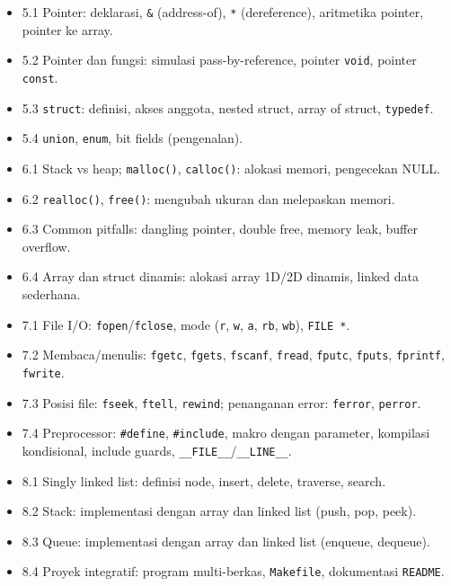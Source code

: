 \documentclass[12pt,a4paper]{article}
\begin{document}
\begin{description}[style=nextline,leftmargin=*]
  \item[CPMK-5:] \hfill
  \begin{itemize}[nosep]
    \item 5.1 Pointer: deklarasi, \texttt{\&} (address-of), \texttt{*} (dereference), aritmetika pointer, pointer ke array.
    \item 5.2 Pointer dan fungsi: simulasi pass-by-reference, pointer \texttt{void}, pointer \texttt{const}.
    \item 5.3 \texttt{struct}: definisi, akses anggota, nested struct, array of struct, \texttt{typedef}.
    \item 5.4 \texttt{union}, \texttt{enum}, bit fields (pengenalan).
  \end{itemize}

  \item[CPMK-6:] \hfill
  \begin{itemize}[nosep]
    \item 6.1 Stack vs heap; \texttt{malloc()}, \texttt{calloc()}: alokasi memori, pengecekan NULL.
    \item 6.2 \texttt{realloc()}, \texttt{free()}: mengubah ukuran dan melepaskan memori.
    \item 6.3 Common pitfalls: dangling pointer, double free, memory leak, buffer overflow.
    \item 6.4 Array dan struct dinamis: alokasi array 1D/2D dinamis, linked data sederhana.
  \end{itemize}

  \item[CPMK-7:] \hfill
  \begin{itemize}[nosep]
    \item 7.1 File I/O: \texttt{fopen}/\texttt{fclose}, mode (\texttt{r}, \texttt{w}, \texttt{a}, \texttt{rb}, \texttt{wb}), \texttt{FILE *}.
    \item 7.2 Membaca/menulis: \texttt{fgetc}, \texttt{fgets}, \texttt{fscanf}, \texttt{fread}, \texttt{fputc}, \texttt{fputs}, \texttt{fprintf}, \texttt{fwrite}.
    \item 7.3 Posisi file: \texttt{fseek}, \texttt{ftell}, \texttt{rewind}; penanganan error: \texttt{ferror}, \texttt{perror}.
    \item 7.4 Preprocessor: \texttt{\#define}, \texttt{\#include}, makro dengan parameter, kompilasi kondisional, include guards, \texttt{\_\_FILE\_\_}/\texttt{\_\_LINE\_\_}.
  \end{itemize}

  \item[CPMK-8:] \hfill
  \begin{itemize}[nosep]
    \item 8.1 Singly linked list: definisi node, insert, delete, traverse, search.
    \item 8.2 Stack: implementasi dengan array dan linked list (push, pop, peek).
    \item 8.3 Queue: implementasi dengan array dan linked list (enqueue, dequeue).
    \item 8.4 Proyek integratif: program multi-berkas, \texttt{Makefile}, dokumentasi \texttt{README}.
  \end{itemize}
\end{description}
\end{document}
